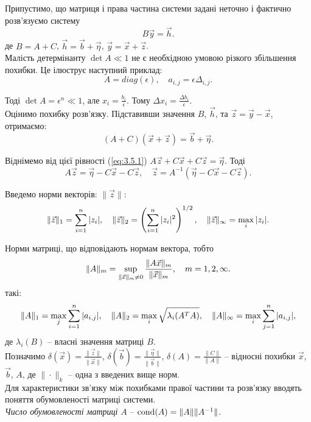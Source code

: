 Припустимо, що матриця і права частина системи задані неточно і фактично розв'язуємо систему
\begin{equation}
	\label{eq:3.24}
	B \vec y = \vec h.
\end{equation}
де $B = A + C$, $\vec h = \vec b + \vec \eta$, $\vec y = \vec x + \vec z$. \\

Малість детермінанту $\det A \ll 1$ не є необхідною умовою різкого збільшення похибки. Це ілюструє наступний приклад: \[A = diag(\epsilon), \quad a_{i,j} = \epsilon \Delta_{i,j}.\]

Тоді $\det A = \epsilon^n \ll 1$, але $x_i = \frac{b_i}{\epsilon}$. Тому $\Delta x_i = \frac{\Delta b_i}{\epsilon}$. \\

Оцінимо похибку розв’язку. Підставивши значення $B$, $\vec h$, та $\vec z = \vec y - \vec x$, отримаємо: \[ (A+C)(\vec x + \vec z) = \vec b +\vec \eta.\]

Віднімемо від цієї рівності (\ref{eq:3.5.1}) $A \vec z + C \vec x + C \vec z = \vec \eta$. Тоді
\[ A \vec z = \vec \eta - C \vec x - C \vec z, \quad \vec z = A^{-1}(\vec \eta - C \vec x - C \vec z).\]

Введемо норми векторів: $\|\vec z\|$:
\[ \|\vec z\|_1 = \displaystyle\sum\limits_{i=1}^n |z_i|, \quad \|\vec z\|_2 = \left(\displaystyle\sum\limits_{i=1}^n |z_i|^2\right)^{1/2}, \quad \|\vec z\|_\infty = \displaystyle\max\limits_i |z_i|. \]

Норми матриці, що відповідають нормам вектора, тобто
\[ \|A\|_m = \displaystyle\sup\limits_{\|\vec x\|_m \ne 0} \dfrac{\|A\vec x\|_m}{\|\vec x\|_m}, \quad m=1,2,\infty. \]
такі: \[ \|A\|_1 = \displaystyle\max\limits_j \displaystyle\sum\limits_{i=1}^n |a_{i,j}|, \quad \|A\|_2 = \displaystyle\max\limits_i \sqrt{\lambda_i (A^TA)}, \quad \|A\|_\infty = \displaystyle\max\limits_i \displaystyle\sum\limits_{j=1}^n |a_{i,j}|, \]
де $\lambda_i(B)$ -- власні значення матриці $B$. \\

Позначимо $\delta(\vec x) = \frac{\|\vec z\|}{\|\vec x\|}$, $\delta(\vec b) = \frac{\|\vec \eta\|}{\|\vec b\|}$, $\delta(A) = \frac{\|C\|}{\|A\|}$ -- відносні похибки $\vec x$, $\vec b$, $A$, де $\|\cdot\|_k$ -- одна з введених вище норм. \\

Для характеристики зв'язку між похибками правої частини та розв'язку вводять поняття обумовленості матриці системи. \\

\textit{Число обумовленості матриці} $A$ -- $\operatorname{cond} (A) = \|A\|\|A^{-1}\|$.

